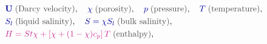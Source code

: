 \documentclass[landscape,24pt, a0paper,colspace=10mm,blockverticalspace=12mm]{tikzposter}
\newcommand{\varColor}[1]{\textcolor{dukeblue}{#1}}
\newcommand{\eqnColor}[1]{\textcolor{royalfuchsia}{#1}}
\newcommand{\varLabel}[1]{\textcolor{eqnLabelGray}{\text{#1}}}
\begin{document}
\begin{columns}
\begin{subcolumns}
{\begin{minipage}[t]{0.55\linewidth}

\end{minipage} \hfill
\begin{minipage}[t]{0.4\linewidth}
\vspace{-1.2\baselineskip}
\begin{align*}
&\varColor{\mathbf{U}}\; \varLabel{(Darcy velocity)}, \quad \varColor{\chi} \; \varLabel{(porosity)}, \quad \varColor{p} \; \varLabel{(pressure)}, \quad \varColor{T} \; \varLabel{(temperature)},\\
&\varColor{S_l} \; \varLabel{(liquid salinity)}, \quad \varColor{S = \chi S_l} \; \varLabel{(bulk salinity)},  \\
&\eqnColor{H = St \chi + \left[\chi + (1-\chi) c_p \right] T} \; \varLabel{(enthalpy)}, \\

\end{align*}
\end{minipage}}
\end{subcolumns}
\end{columns}
\end{document}
